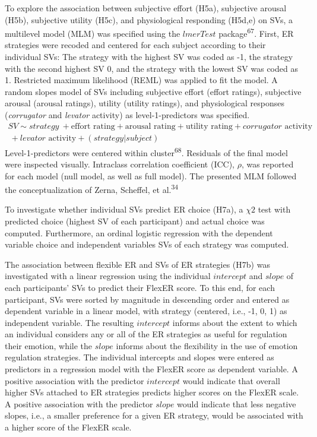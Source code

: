 \documentclass[
  man,floatsintext]{apa6}
\begin{document}
To explore the association between subjective effort (H5a), subjective arousal (H5b), subjective utility (H5c), and physiological responding (H5d,e) on SVs, a multilevel model (MLM) was specified using the \(lmerTest\) package\textsuperscript{67}.
First, ER strategies were recoded and centered for each subject according to their individual SVs: The strategy with the highest SV was coded as -1, the strategy with the second highest SV 0, and the strategy with the lowest SV was coded as 1.
Restricted maximum likelihood (REML) was applied to fit the model.
A random slopes model of SVs including subjective effort (effort ratings), subjective arousal (arousal ratings), utility (utility ratings), and physiological responses (\emph{corrugator} and \emph{levator} activity) as level-1-predictors was specified.
\[
\begin{split}
SV \sim strategy\ + \text{effort rating} + \text{arousal rating} + \text{utility rating} + corrugator \text{ activity} \\\ + levator \text{ activity} + (strategy|subject)
\end{split}
\]
Level-1-predictors were centered within cluster\textsuperscript{68}.
Residuals of the final model were inspected visually.
Intraclass correlation coefficient (ICC), \(\rho\), was reported for each model (null model, as well as full model).
The presented MLM followed the conceptualization of Zerna, Scheffel, et al.\textsuperscript{34}

To investigate whether individual SVs predict ER choice (H7a), a \(\chi{2}\) test with predicted choice (highest SV of each participant) and actual choice was computed.
Furthermore, an ordinal logistic regression with the dependent variable choice and independent variables SVs of each strategy was computed.

The association between flexible ER and SVs of ER strategies (H7b) was investigated with a linear regression using the individual \(intercept\) and \(slope\) of each participants' SVs to predict their FlexER score.
To this end, for each participant, SVs were sorted by magnitude in descending order and entered as dependent variable in a linear model, with strategy (centered, i.e., -1, 0, 1) as independent variable.
The resulting \(intercept\) informs about the extent to which an individual considers any or all of the ER strategies as useful for regulation their emotion, while the \(slope\) informs about the flexibility in the use of emotion regulation strategies.
The individual intercepts and slopes were entered as predictors in a regression model with the FlexER score as dependent variable.
A positive association with the predictor \(intercept\) would indicate that overall higher SVs attached to ER strategies predicts higher scores on the FlexER scale.
A positive association with the predictor \(slope\) would indicate that less negative slopes, i.e., a smaller preference for a given ER strategy, would be associated with a higher score of the FlexER scale.
\end{document}
